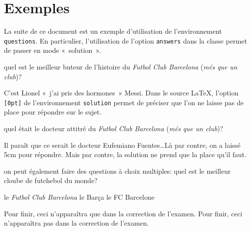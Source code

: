 \documentclass[addpoints,fr,biblatex,name,gradetable]{isae-exam}
\begin{document}
\section{Exemples}
\label{sec:exemples}

La suite de ce document est un exemple d'utilisation de
l'environnement \lstinline!questions!. En particulier, l'utilisation
de l'option \lstinline!answers! dans la classe permet de passer en
mode «~solution~».

\begin{questions}
\question[1] quel est le meilleur buteur de l'histoire du \textit{Futbol
  Club Barcelona} (\textit{més que un club})?

\begin{solution}[0pt]

  C'est Lionel «~j'ai pris des hormones~» Messi. Dans le source
  \LaTeX, l'option \lstinline![0pt]! de l'environnement
  \lstinline!solution! permet de préciser que l'on ne laisse pas de
  place pour répondre sur le sujet.
\end{solution}

\question[1\half] quel était le docteur attitré du \textit{Futbol
  Club Barcelona} (\textit{més que un club})?

\begin{solution}[5cm]

  Il paraît que ce serait le docteur Eufemiano Fuentes\ldots Là par
  contre, on a laissé 5cm pour répondre. Mais par contre, la
  solution ne prend que la place qu'il faut.
\end{solution}

\question[\half] on peut également faire des questions à choix multiples:
quel est le meilleur cloube de futchebol du monde?

\begin{checkboxes}
  \CorrectChoice le \textit{Futbol Club Barcelona}
  \choice le Barça
  \choice le FC Barcelone
\end{checkboxes}
\end{questions}

\ifprintanswers
  Pour finir, ceci n'apparaîtra que dans la correction de l'examen.
\else
  Pour finir, ceci n'apparaîtra pas dans la correction de l'examen.
\fi

\printbibliography
\end{document}
